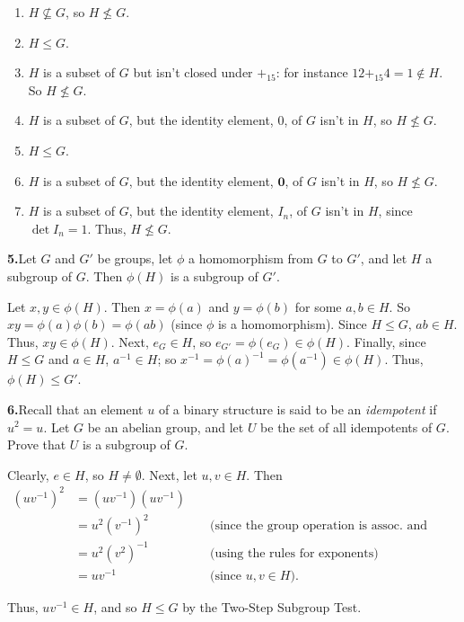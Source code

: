 \documentclass[10pt,]{book}
\theoremstyle{plain}
\theoremstyle{definition}
\theoremstyle{definition}
\theoremstyle{definition}
\theoremstyle{definition}
\numberwithin{equation}{section}
\def\0{\mathbf 0}
\newcommand{\amp}{&}
\begin{document}
%
\par\smallskip
\leavevmode%
\begin{enumerate}[label=(\alph*)]
\item\hypertarget{li-305}{}\(H\not\subseteq G\), so \(H\not\leq G\).%
\item\hypertarget{li-306}{}\(H\leq G\).%
\item\hypertarget{li-307}{}\(H\) is a subset of \(G\) but isn't closed under \(+_{15}\): for instance \(12+_{15}4=1\not\in H\).  So \(H\not\leq G\).%
\item\hypertarget{li-308}{}\(H\) is a subset of \(G\), but the identity element, 0, of \(G\) isn't in \(H\), so \(H\not\leq G\).%
\item\hypertarget{li-309}{}\(H\leq G\).%
\item\hypertarget{li-310}{}\(H\) is a subset of \(G\), but the identity element, \(\0\), of \(G\) isn't in \(H\), so \(H\not\leq G\).%
\item\hypertarget{li-311}{}\(H\) is a subset of \(G\), but the identity element, \(I_n\), of \(G\) isn't in \(H\), since \(\det I_n=1\).  Thus, \(H\not\leq G\).%
\end{enumerate}
\par\smallskip
\noindent\textbf{5.}\quad{}Let \(G\) and \(G'\) be groups, let \(\phi\) a homomorphism from \(G\) to \(G'\), and let \(H\) a subgroup of \(G\). Then \(\phi(H)\) is a subgroup of \(G'\).%
\par\smallskip
Let \(x,y\in \phi(H)\). Then \(x=\phi(a)\) and \(y=\phi(b)\) for some \(a,b\in H\). So \(xy=\phi(a)\phi(b)=\phi(ab)\) (since \(\phi\) is a homomorphism). Since \(H\leq G\), \(ab\in H\). Thus, \(xy\in \phi(H)\). Next, \(e_G\in H\), so \(e_{G'}=\phi(e_G)\in \phi(H)\). Finally, since \(H\leq G\) and \(a\in H\), \(a^{-1}\in H\); so \(x^{-1}=\phi(a)^{-1}=\phi(a^{-1}) \in \phi(H)\). Thus, \(\phi(H)\leq G'\).%
\par\smallskip
\noindent\textbf{6.}\quad{}Recall that an element \(u\) of a binary structure is said to be an \emph{idempotent} if \(u^2=u\). Let \(G\) be an abelian group, and let \(U\) be the set of all idempotents of \(G\). Prove that \(U\) is a subgroup of \(G\).%
\par\smallskip
Clearly, \(e\in H\), so \(H\neq \emptyset\). Next, let \(u,v\in H\). Then%
\begin{align*}
(uv^{-1})^2\amp =(uv^{-1})(uv^{-1})\amp \amp\\
\amp =u^2(v^{-1})^2 \amp \amp \text{ (since the group operation is assoc. and comm.) }\\
\amp =u^2(v^2)^{-1} \amp \amp \text{ (using the rules for exponents) }\\
\amp =uv^{-1}\amp \amp \text{ (since \(u,v\in H\)). }
\end{align*}
%
\par
Thus, \(uv^{-1}\in H\), and so \(H \leq G\) by the Two-Step Subgroup Test.%
\par\smallskip
\end{document}
